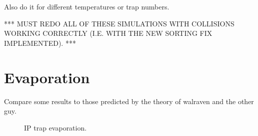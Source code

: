 Also do it for different temperatures or trap numbers.

*** MUST REDO ALL OF THESE SIMULATIONS WITH COLLISIONS WORKING CORRECTLY (I.E. WITH THE NEW SORTING FIX IMPLEMENTED). ***


\section{Evaporation}

Compare some results to those predicted by the theory of walraven and the other guy. 

\begin{figure}[bth]
\myfloatalign
{} \quad
{}
\caption[]{IP trap evaporation.}\label{fig:dsmccolerr}
\end{figure}


